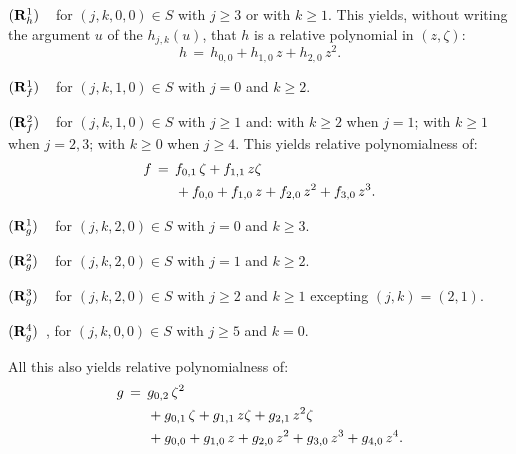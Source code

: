 \documentclass[12pt,twoside,leqno,openany]{amsart}
\begin{document}
\begin{center}

\end{center}

\medskip\noindent$({\bf R}_h^1)$\,
\,\,
for $(j,k,0,0) \in S$ with $j \geqslant 3$ or with $k \geqslant 1$.
This yields, without writing the argument $u$
of the $h_{j,k}(u)$, that $h$
is a relative polynomial in $(z, \zeta)$:
\[
h
\,=\,
h_{0,0}
+
h_{1,0}\,z
+
h_{2,0}\,z^2.
\]

\begin{center}

\end{center}

\medskip\noindent$({\bf R}_f^1)$\,
\,\,
for $(j,k,1,0) \in S$
with $j = 0$ and $k \geqslant 2$.

\medskip\noindent$({\bf R}_f^2)$\,
\,\,
for $(j,k,1,0) \in S$ with $j \geqslant 1$ 
and: with $k \geqslant 2$ when $j = 1$; with 
$k \geqslant 1$ when $j = 2, 3$; with $k \geqslant 0$ when $j
\geqslant 4$.
This yields relative polynomialness of:
\[
\aligned
f
&
\,=\,
f_{0,1}\,\zeta
+
f_{1,1}\,z\zeta
\\
&
\ \ \ \ \
+
f_{0,0}
+
f_{1,0}\,z
+
f_{2,0}\,z^2
+
f_{3,0}\,z^3.
\endaligned
\]

\begin{center}

\end{center}

\medskip\noindent$({\bf R}_g^1)$\,
\,\,
for $(j,k,2,0) \in S$ with $j = 0$ and $k \geqslant 3$.

\medskip\noindent$({\bf R}_g^2)$\,
\,\,
for $(j,k,2,0) \in S$ with 
$j = 1$ and $k \geqslant 2$.

\medskip\noindent$({\bf R}_g^3)$\,
\,\,
for $(j,k,2,0) \in S$ with $j \geqslant 2$ and $k \geqslant 1$
excepting $(j,k) = (2,1)$.

\medskip\noindent$({\bf R}_g^4)$\,
,
for $(j,k,0,0) \in S$ with $j \geqslant 5$ and $k = 0$.

\medskip

All this also yields relative polynomialness of:
\[
\aligned
g
&
\,=\,
g_{0,2}\,\zeta^2
\\
&
\ \ \ \ \
+
g_{0,1}\,\zeta
+
g_{1,1}\,z\zeta
+
g_{2,1}\,z^2\zeta
\\
&
\ \ \ \ \
+
g_{0,0}
+
g_{1,0}\,z
+
g_{2,0}\,z^2
+
g_{3,0}\,z^3
+
g_{4,0}\,z^4.
\endaligned
\]
\end{document}
